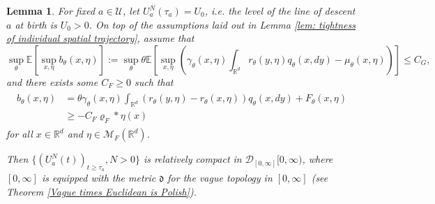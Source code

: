 \documentclass[12pt]{article}
\newtheorem{lemma}[theorem]{Lemma}
\newcommand{\IR}{\mathbb R}
\begin{document}
\begin{lemma} \label{lem:tightness of levels} For fixed $a\in \mathcal{U}$, let $U^N_{a}(\tau_a)=U_0$, i.e. the level of the line of descent $a$ at birth is $U_0>0$.
On top of the assumptions laid out in Lemma \ref{lem: tightness of individual spatial trajectory}, assume that 
$$
    \sup_{\theta}\mathbb{E}\left[ \sup_{x, \eta}b_\theta(x, \eta) \right]
    :=
    \sup_{\theta}
    \theta 
    \mathbb{E}\left[ \sup_{x, \eta} \left(
    \gamma_\theta(x,\eta) \int_{\IR^d} r_\theta(y, \eta) q_\theta(x, dy)
    -
    \mu_\theta(x,\eta)
    \right)\right] 
    \leq C_G,
$$
and there exists some $C_F \geq 0$ such that
\begin{align} 
\begin{split}
b_{\theta}(x, \eta)
&=
    \theta \gamma_{\theta}(x, \eta) \int_{\IR^d} \left( r_{\theta}(y, \eta) - r_{\theta}(x, \eta) \right) q_{\theta}(x, dy)
    + F_{\theta}(x, \eta) \\
& \geq - C_F \varrho_F*\eta(x)
\end{split}
\end{align}
for all $x \in \mathbb{R}^d$ and  $\eta \in \mathcal{M}_{F}(\mathbb{R}^d)$.

Then
$\{(U^{N}_{a}(t))_{t \geq \tau_a}, N >0\}$ is relatively compact in 
$\mathcal{D}_{[0,\infty]}[0,\infty )$, where $[0,\infty]$ is equipped with the metric $\mathfrak{d}$ for the vague topology in $[0,\infty]$ (see Theorem  \ref{Vague times Euclidean is Polish}).
\end{lemma}
\end{document}

